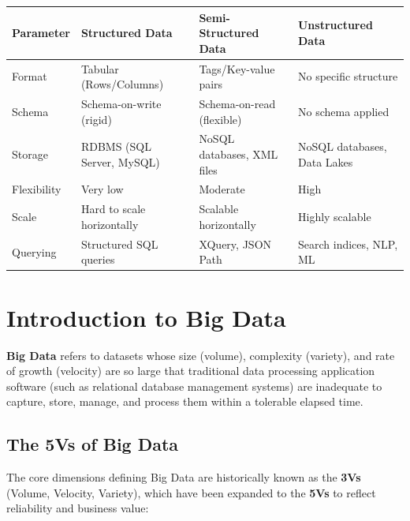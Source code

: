 \documentclass[12pt,a4paper]{article}
\renewcommand{\arraystretch}{1.45}
\begin{document}
\par\vspace{6pt}\noindent
{\renewcommand{\arraystretch}{1.4}%
\begin{tabularx}{\linewidth}{|B{2.8cm}|Y|Y|Y|}
\hline
\textbf{Parameter} & \textbf{Structured Data} & \textbf{Semi-Structured Data} & \textbf{Unstructured Data} \\
\hline
Format & Tabular (Rows/Columns) & Tags/Key-value pairs & No specific structure \\
\hline
Schema & Schema-on-write (rigid) & Schema-on-read (flexible) & No schema applied \\
\hline
Storage & RDBMS (SQL Server, MySQL) & NoSQL databases, XML files & NoSQL databases, Data Lakes \\
\hline
Flexibility & Very low & Moderate & High \\
\hline
Scale & Hard to scale horizontally & Scalable horizontally & Highly scalable \\
\hline
Querying & Structured SQL queries & XQuery, JSON Path & Search indices, NLP, ML \\
\hline
\end{tabularx}}

\section{Introduction to Big Data}

\begin{tcolorbox}[defbox, title={Big Data}]
  \textbf{Big Data} refers to datasets whose size (volume), complexity (variety), and rate of growth (velocity) are so large that traditional data processing application software (such as relational database management systems) are inadequate to capture, store, manage, and process them within a tolerable elapsed time.
\end{tcolorbox}

\subsection{The 5Vs of Big Data}
The core dimensions defining Big Data are historically known as the \textbf{3Vs} (Volume, Velocity, Variety), which have been expanded to the \textbf{5Vs} to reflect reliability and business value:
\end{document}
